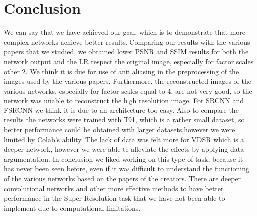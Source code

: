 \documentclass[10pt,twocolumn,letterpaper]{article}
\begin{document}
\section{Conclusion}
We can say that we have achieved our goal, which is to demonstrate that more complex networks achieve better results.
Comparing our results with the various papers that we studied, we obtained lower PSNR and SSIM results for both the network output and the LR respect the original image, especially for factor scales other 2. We think it is due for use of anti aliasing in the preprocessing of the images used by the various papers.
Furthermore, the reconstructed images of the various networks, especially for factor scales equal to 4, are not very good, so the network was unable to reconstruct the high resolution image.
For SRCNN and FSRCNN we think it is due to an architecture
too easy. Also to compare the results the networks were trained with T91, which is a rather small dataset, so better performance could be obtained with larger datasets,however we were limited by Colab's ability.
The lack of data was felt more for VDSR which is a deeper network, however we were able to alleviate the effects by applying data argumentation.
In conclusion we liked working on this type of task, because it has never been seen before, even if it was difficult to understand the functioning of the various networks based on the papers of the creators. There are deeper convolutional networks and other more effective methods to have better performance in the Super Resolution task that we have not been able to implement due to computational limitations.

{\small


}
\end{document}
